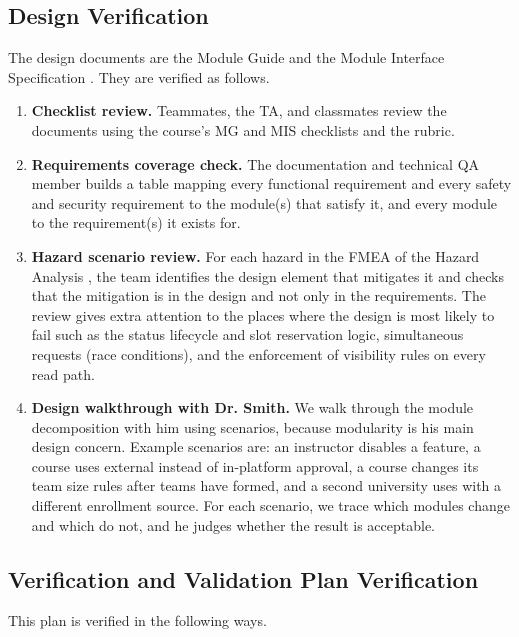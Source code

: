 \documentclass[12pt, titlepage]{article}
\begin{document}
  \subsection{Design Verification}
  \label{sec:design-verification}

  The design documents are the Module Guide and the Module Interface Specification \citep{MG, MIS}. They are verified as follows.

  \begin{enumerate}
    \item \textbf{Checklist review.} Teammates, the TA, and classmates review the documents using the
    course's MG and MIS checklists and the rubric.
    \item \textbf{Requirements coverage check.} The documentation and technical QA member builds a table
    mapping every functional requirement and every safety and security requirement to the module(s) that satisfy it,
    and every module to the requirement(s) it exists for.
    \item \textbf{Hazard scenario review.} For each hazard in the FMEA of the Hazard Analysis \citep{HazardAnalysis},
    the team identifies the design element that mitigates it and checks that the mitigation is in the
    design and not only in the requirements. The review gives extra attention to the places where
    the design is most likely to fail such as the status lifecycle and slot reservation logic,
    simultaneous requests (race conditions), and the enforcement of visibility rules on every read path.
    \item \textbf{Design walkthrough with Dr. Smith.} We walk through the module decomposition with him using
    scenarios, because modularity is his main design concern.
    Example scenarios are: an instructor disables a feature, a course uses external instead of
    in-platform approval, a course changes its team size rules after teams have formed,
    and a second university uses \projname{} with a different enrollment source.
    For each scenario, we trace which modules change and which do not, and he judges whether the result is acceptable.
  \end{enumerate}

  \subsection{Verification and Validation Plan Verification}
  \label{sec:vnv-verification}

  This plan is verified in the following ways.
\end{document}

